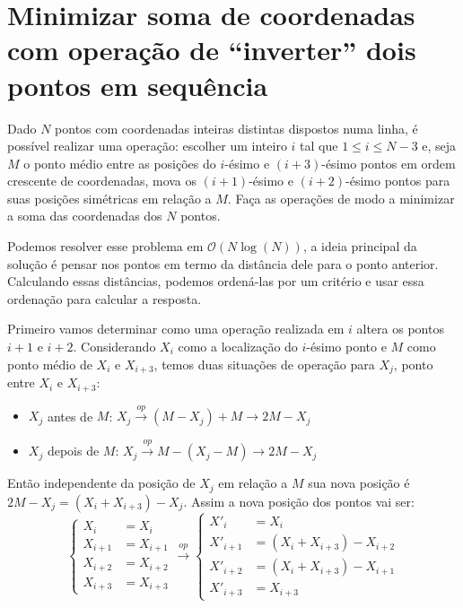 
\section{Minimizar soma de coordenadas com operação de ``inverter'' dois pontos em sequência}
Dado $N$ pontos com coordenadas inteiras distintas dispostos numa linha, é possível realizar uma operação: escolher um inteiro $i$ tal que $1 \le i \le N-3$ e, seja $M$ o ponto médio entre as posições do $i$-ésimo e $(i+3)$-ésimo pontos em ordem crescente de coordenadas, mova os $(i+1)$-ésimo e $(i+2)$-ésimo pontos para suas posições simétricas em relação a $M$. Faça as operações de modo a minimizar a soma das coordenadas dos $N$ pontos.

Podemos resolver esse problema em $\mathcal{O}(N \log(N))$, a ideia principal da solução é pensar nos pontos em termo da distância dele para o ponto anterior. Calculando essas distâncias, podemos ordená-las por um critério e usar essa ordenação para calcular a resposta.

Primeiro vamos determinar como uma operação realizada em $i$ altera os pontos $i+1$ e $i+2$. Considerando $X_i$ como a localização do $i$-ésimo ponto e $M$ como ponto médio de $X_i$ e $X_{i+3}$, temos duas situações de operação para $X_j$, ponto entre $X_i$ e $X_{i+3}$:
\begin{itemize}
    \item $X_j$ antes de $M$: $X_j \xrightarrow{op} (M-X_j)+M \rightarrow 2M-X_j$
    \item $X_j$ depois de $M$: $X_j \xrightarrow{op} M-(X_j-M) \rightarrow 2M-X_j$
\end{itemize}
Então independente da posição de $X_j$ em relação a $M$ sua nova posição é $2M - X_j = (X_i+X_{i+3})-X_j$. Assim a nova posição dos pontos vai ser:
\[
    \begin{cases}
    X_i &= X_i \\
    X_{i+1} &= X_{i+1} \\
    X_{i+2} &= X_{i+2} \\
    X_{i+3} &= X_{i+3}  
    \end{cases}
    \xrightarrow{op}
    \begin{cases}
    X'_i &= X_i \\
    X'_{i+1} &= (X_i+X_{i+3})-X_{i+2} \\
    X'_{i+2} &= (X_i+X_{i+3})-X_{i+1} \\
    X'_{i+3} &= X_{i+3} 
    \end{cases}
\]

